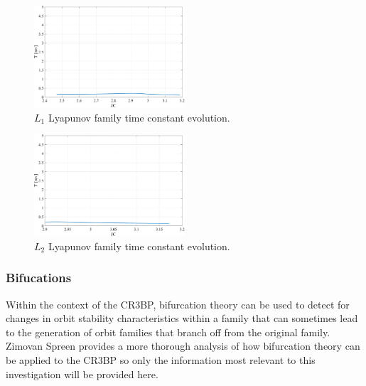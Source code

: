 \begin{figure}[ht]
    \centering
    \includegraphics[width=0.5\textwidth]{figures/L1LyapunovTimeConstant.pdf}
    \caption{$L_{1}$ Lyapunov family time constant evolution.}
    \label{fig:L1LyapunovTimeConstant}
\end{figure}

\begin{figure}[ht]
    \centering
    \includegraphics[width=0.5\textwidth]{figures/L2LyapunovTimeConstant.pdf}
    \caption{$L_{2}$ Lyapunov family time constant evolution.}
    \label{fig:L2LyapunovTimeConstant}
\end{figure}

\subsubsection{Bifucations}
Within the context of the CR3BP, bifurcation theory can be used to detect for changes in orbit
stability characteristics within a family that can sometimes lead to the generation of orbit
families that branch off from the original family. Zimovan Spreen provides a more thorough
analysis of how bifurcation theory can be applied to the CR3BP so only the information most
relevant to this investigation will be provided here\cite{ZimovanSpreen:2021}.

